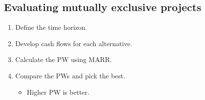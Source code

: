 \subsection{Evaluating mutually exclusive projects}
\begin{process}
    \begin{enumerate}
        \item Define the time horizon.
        
        \item Develop cash flows for each alternative.
        
        \item Calculate the PW using MARR.
        
        \item Compare the PWs and pick the best.
            \begin{itemize}
                \item Higher PW is better.
            \end{itemize}
    \end{enumerate}
\end{process}

